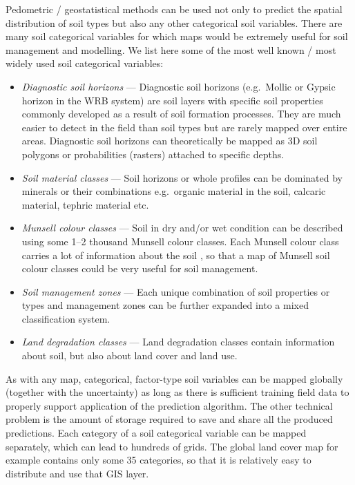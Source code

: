 \documentclass[11pt]{krantz}
\theoremstyle{definition}
\theoremstyle{definition}
\theoremstyle{definition}
\theoremstyle{remark}
\begin{document}
Pedometric / geostatistical methods can be used not only to predict the
spatial distribution of soil types but also any other categorical soil
variables. There are many soil categorical variables for which maps
would be extremely useful for soil management and modelling. We list
here some of the most well known / most widely used soil categorical
variables:

\begin{itemize}
\item
  \emph{Diagnostic soil horizons} --- Diagnostic soil horizons
  (e.g.~Mollic or Gypsic horizon in the WRB system) are soil layers with
  specific soil properties commonly developed as a result of soil
  formation processes. They are much easier to detect in the field than
  soil types but are rarely mapped over entire areas. Diagnostic soil
  horizons can theoretically be mapped as 3D soil polygons or
  probabilities (rasters) attached to specific depths.
\item
  \emph{Soil material classes} --- Soil horizons or whole profiles can
  be dominated by minerals or their combinations e.g.~organic material
  in the soil, calcaric material, tephric material etc.
\item
  \emph{Munsell colour classes} --- Soil in dry and/or wet condition can
  be described using some 1--2 thousand Munsell colour classes. Each
  Munsell colour class carries a lot of information about the soil
  \citep{fernandez1988color}, so that a map of Munsell soil colour
  classes could be very useful for soil management.
\item
  \emph{Soil management zones} --- Each unique combination of soil
  properties or types and management zones can be further expanded into
  a mixed classification system.
\item
  \emph{Land degradation classes} --- Land degradation classes contain
  information about soil, but also about land cover and land use.
\end{itemize}

As with any map, categorical, factor-type soil variables can be mapped
globally (together with the uncertainty) as long as there is sufficient
training field data to properly support application of the prediction
algorithm. The other technical problem is the amount of storage required
to save and share all the produced predictions. Each category of a soil
categorical variable can be mapped separately, which can lead to
hundreds of grids. The global land cover map for example contains only
some 35 categories, so that it is relatively easy to distribute and use
that GIS layer.
\end{document}
